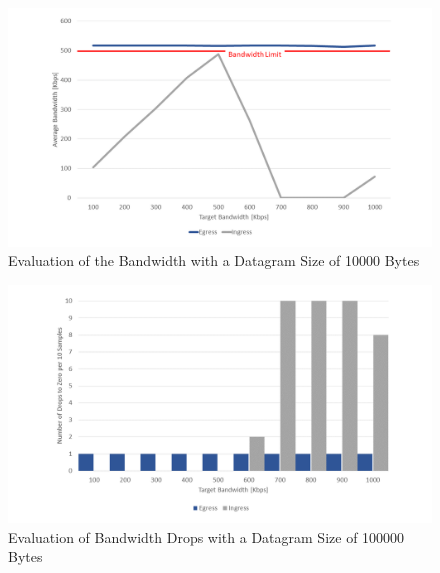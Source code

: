 \begin{figure}[h]
	\centering
	\includegraphics[width=\textwidth]{img/Evaluation-Bandwidth-Big-Buffer.png}
	\caption{Evaluation of the Bandwidth with a Datagram Size of 10000 Bytes}
	\label{Evaluation of the Bandwidth with a Datagram Size of 10000 Bytes}
\end{figure}

\begin{figure}[h]
	\centering
	\includegraphics[width=\textwidth]{img/Evaluation-Zeros-Big-Buffer.png}
	\caption{Evaluation of Bandwidth Drops with a Datagram Size of 100000 Bytes}
	\label{Evaluation of Bandwidth Drops with a Datagram Size of 100000 Bytes}
\end{figure}
\newpage

